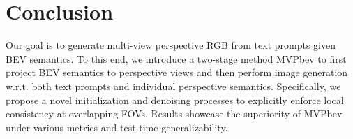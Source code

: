 \section{Conclusion}
\label{sec:conclusion}
Our goal is to generate multi-view perspective RGB from text prompts given BEV semantics. To this end, we introduce a two-stage method MVPbev to first project BEV semantics to perspective views and then perform image generation w.r.t. both text prompts and individual perspective semantics. Specifically, we propose a novel initialization and denoising processes to explicitly enforce local consistency at overlapping FOVs. Results showcase the superiority of MVPbev under various metrics and test-time generalizability.

